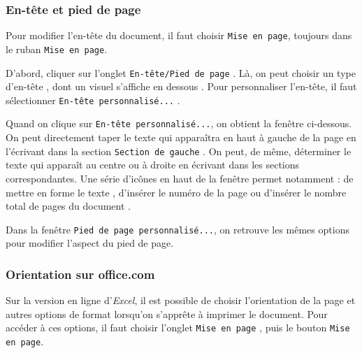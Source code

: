 


\subsubsection{En-tête et pied de page}

Pour modifier l'en-tête du document, il faut choisir \texttt{Mise en page}, toujours dans le ruban \texttt{Mise en page}.

D'abord, cliquer sur l'onglet \texttt{En-tête/Pied de page} . Là, on peut choisir un type d'en-tête , dont un visuel s'affiche en dessous . Pour personnaliser l'en-tête, il faut sélectionner \texttt{En-tête personnalisé...} .


Quand on clique sur \texttt{En-tête personnalisé...}, on obtient la fenêtre ci-dessous. On peut directement taper le texte qui apparaîtra en haut à gauche de la page en l'écrivant dans la section \texttt{Section de gauche} . On peut, de même, déterminer le texte qui apparaît au centre ou à droite en écrivant dans les sections correspondantes. Une série d'icônes en haut de la fenêtre permet notamment : de mettre en forme le texte , d'insérer le numéro de la page  ou d'insérer le nombre total de pages du document .



Dans la fenêtre \texttt{Pied de page personnalisé...}, on retrouve les mêmes options pour modifier l'aspect du pied de page.

\subsubsection{Orientation sur office.com}\label{Calc2FormaterPage}

Sur la version en ligne d'\emph{Excel}, il est possible de choisir l'orientation de la page et autres options de format lorsqu'on s'apprête à imprimer le document. Pour accéder à ces options, il faut choisir l'onglet \texttt{Mise en page} , puis le bouton \texttt{Mise en page}. 


